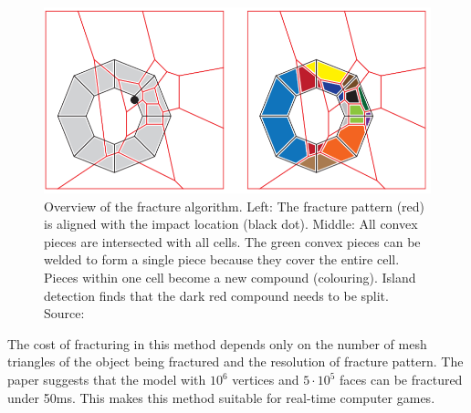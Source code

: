 \begin{figure}
\centering
        \includegraphics[width=\textwidth]{img/vacdAlgorithm}
        \caption{Overview of the fracture algorithm. Left: The fracture pattern (red) is aligned with the impact location (black dot). Middle: All
convex pieces are intersected with all cells. The green convex pieces can be welded to form a single piece because they cover the entire
cell. Pieces within one cell become a new compound (colouring). Island detection finds that the dark red compound needs to be split. Source: \citet{nvidia}}
        \label{fig:vacdalg}
\end{figure}

The cost of fracturing in this method depends only on the number of mesh triangles of the object being fractured and the resolution of fracture pattern. The paper suggests that the model with $10^6$ vertices and $5\cdot10^5$ faces can be fractured under 50ms. This makes this method suitable for real-time computer games.

